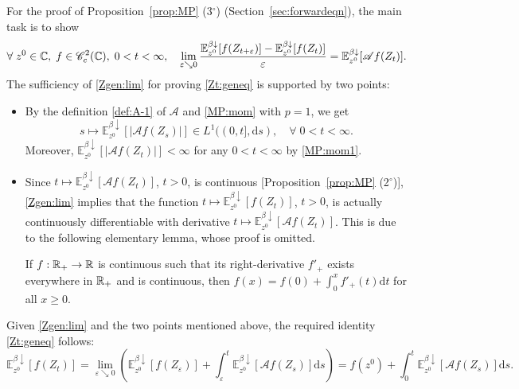 \documentclass[12pt, twoside]{article}
\numberwithin{figure}{section}
\newcommand{\1}{\mathds 1}
\newcommand{\C}{{\mathscr C}}
\newcommand{\vep}{{\varepsilon}}
\newcommand{\da}{{\downarrow}}
\newcommand{\ms}{\mathscr}
\newcommand{\E}{{\mathbb E}}
\renewcommand{\d}{{\mathrm d}}
\newcommand{\R}{{\Bbb R}}
\newcommand{\2}{{\mathbf 1}}
\newcommand{\cc}{{^\circ}}
\begin{document}
For the proof of  Proposition~\ref{prop:MP} (3$\cc$) (Section~\ref{sec:forwardeqn}), the main task is to show 
\begin{align}\label{Zgen:lim}
\forall\;z^0\in \Bbb C,\;f\in \C_c^2(\Bbb C),\;0<t<\infty,\quad 
\lim_{\vep\searrow 0}\frac{\E^{\beta\da}_{z^0}[f(Z_{t+\vep})]-\E^{\beta\da}_{z^0}[f(Z_t)]}{\vep}=\E^{\beta\da}_{z^0}[\ms Af(Z_t)].
\end{align}
The sufficiency of \eqref{Zgen:lim} for proving \eqref{Zt:geneq} is supported by two points:
\begin{itemize}
\item By the definition \eqref{def:A-1} of $\ms A$ and \eqref{MP:mom} with $p=1$, we get
\[
s\mapsto \E^{\beta\da}_{z^0}[|\ms Af(Z_s)|]
\in L^1((0,t],\d s), \quad \forall\;0<t<\infty.
\]
Moreover, $\E^{\beta\da}_{z^0}[|\ms Af(Z_t)|]<\infty$ for any $0<t<\infty$ by \eqref{MP:mom1}.
\item Since $t\mapsto \E^{\beta\da}_{z^0}[\ms Af(Z_t)]$, $t>0$, is continuous [Proposition~\ref{prop:MP} (2$\cc$)], \eqref{Zgen:lim} implies that the function $t\mapsto \E^{\beta\da}_{z^0}[f(Z_t)]$, $t>0$, is actually continuously differentiable with derivative $t\mapsto \E^{\beta\da}_{z^0}[\ms Af(Z_t)]$. This is due to the following elementary lemma, whose proof is omitted.

\begin{lem}\label{lem:LC2}
If $f:\R_+\to \R$ is continuous such that its right-derivative $f'_+$ exists everywhere in $\R_+$ and is continuous, then $f(x)=f(0)+\int_0^x f'_+(t)\d t$ for all $x\geq 0$. 
\end{lem}
\end{itemize}
Given \eqref{Zgen:lim} and the two points mentioned above, the required identity \eqref{Zt:geneq} follows:
\[
\E^{\beta\da}_{z^0}[f(Z_t)]=
\lim_{\vep \searrow 0}\left(\E^{\beta\da}_{z^0}[f(Z_\vep)]+\int_\vep^t \E^{\beta\da}_{z^0}[\ms Af(Z_s)]\d s\right)=f(z^0)+\int_0^t \E_{z^0}^{\beta\da}[\ms Af(Z_s)]\d s.
\]
\end{document}
